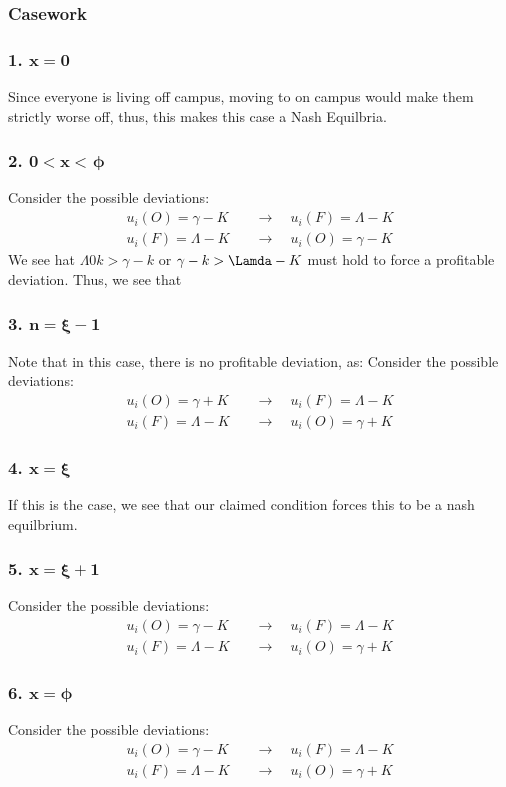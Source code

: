 \documentclass[12pt]{article}
\begin{document}
\subsubsection{Casework}
\subsubsection*{1. $\mathbf{x = 0}$}
Since everyone is living off campus, moving to on campus would make them strictly worse off, thus, this makes this case a Nash Equilbria. 
\subsubsection*{2. $\mathbf{0 < x <} \hspace{1pt} \bm{\phi}$}
Consider the possible deviations:
\begin{align*}
    u_i(O) = \gamma - K \quad &\to \quad u_i(F) = \Lambda - K \\
    u_i(F) = \Lambda - K\quad &\to \quad u_i(O) = \gamma - K
\end{align*}
We see hat $\Lambda 0 k > \gamma - k$ or $\gamma - k > \Lamda - K$ must hold to force a profitable deviation. Thus, we see that 
\subsubsection*{3. $\mathbf{n = \xi - 1}$} 
Note that in this case, there is no profitable deviation, as:
Consider the possible deviations:
\begin{align*}
    u_i(O) = \gamma + K \quad &\to \quad u_i(F) = \Lambda - K \\
    u_i(F) = \Lambda - K\quad &\to \quad u_i(O) = \gamma + K
\end{align*}
\subsubsection*{4. $\mathbf{x = \xi}$}
If this is the case, we see that our claimed condition forces this to be a nash equilbrium. 
\subsubsection*{5. $\mathbf{x = \xi + 1}$}
Consider the possible deviations:
\begin{align*}
    u_i(O) = \gamma - K \quad &\to \quad u_i(F) = \Lambda - K \\
    u_i(F) = \Lambda - K\quad &\to \quad u_i(O) = \gamma + K
\end{align*}
\subsubsection*{6. $\mathbf{x = \phi}$}
Consider the possible deviations:
\begin{align*}
    u_i(O) = \gamma - K \quad &\to \quad u_i(F) = \Lambda - K \\
    u_i(F) = \Lambda - K\quad &\to \quad u_i(O) = \gamma + K
\end{align*}
\end{document}
